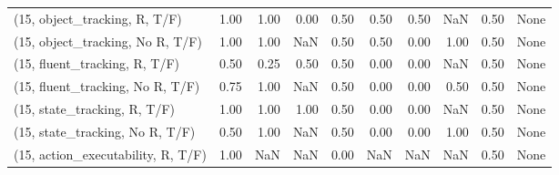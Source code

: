 \begin{table*}[h!]
\begin{adjustbox}{width=2\columnwidth,center}
\begin{tabular}{lrrr|rrr|rrr}
\midrule
(15, object\_tracking, R, T/F)         &                      1.00 &                  1.00 &                      0.00 &                          0.50 &                      0.50 &                          0.50 &                                    NaN &                               0.50 &                                  None \\
(15, object\_tracking, No R, T/F)      &                      1.00 &                  1.00 &                       NaN &                          0.50 &                      0.50 &                          0.00 &                                   1.00 &                               0.50 &                                  None \\
(15, fluent\_tracking, R, T/F)         &                      0.50 &                  0.25 &                      0.50 &                          0.50 &                      0.00 &                          0.00 &                                    NaN &                               0.50 &                                  None \\
(15, fluent\_tracking, No R, T/F)      &                      0.75 &                  1.00 &                       NaN &                          0.50 &                      0.00 &                          0.00 &                                   0.50 &                               0.50 &                                  None \\
(15, state\_tracking, R, T/F)          &                      1.00 &                  1.00 &                      1.00 &                          0.50 &                      0.00 &                          0.00 &                                    NaN &                               0.50 &                                  None \\
(15, state\_tracking, No R, T/F)       &                      0.50 &                  1.00 &                       NaN &                          0.50 &                      0.00 &                          0.00 &                                   1.00 &                               0.50 &                                  None \\
(15, action\_executability, R, T/F)    &                      1.00 &                   NaN &                       NaN &                          0.00 &                       NaN &                           NaN &                                    NaN &                               0.50 &                                  None \\

\end{tabular}
\end{adjustbox}
\end{table*}
